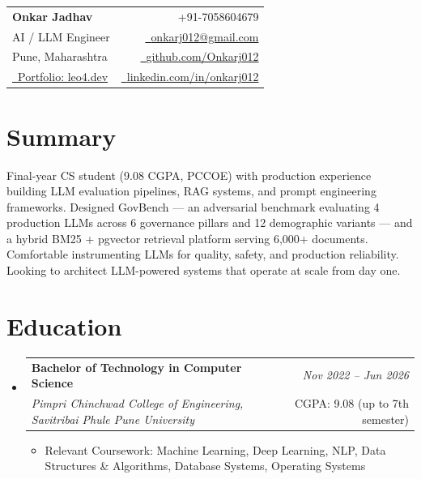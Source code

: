 \documentclass[a4paper,10.5pt]{article}
\makeatletter
\newcommand{\resumeSubheading}[4]{
\vspace{0.8mm}\item
    \begin{tabular*}{0.98\textwidth}[t]{l@{\extracolsep{\fill}}r}
        \textbf{#1} & \textit{\footnotesize{#4}} \\
        \textit{\footnotesize{#3}} & \footnotesize{#2}\\
    \end{tabular*}
    \vspace{-2.0mm}
}
\newcommand{\resumeSubHeadingListStart}{\begin{itemize}[leftmargin=0mm,label={}]}
\newcommand{\resumeItemListStart}{\begin{justify}\begin{itemize}[leftmargin=3ex, rightmargin=2ex, noitemsep, labelsep=1.2mm, itemsep=0.4mm]\small}
\newcommand{\resumeSubHeadingListEnd}{\end{itemize}\vspace{2mm}}
\newcommand{\resumeItemListEnd}{\end{itemize}\end{justify}\vspace{-2mm}}
\newcommand{\name}{Onkar Jadhav}
\newcommand{\phone}{7058604679}
\newcommand{\emaila}{onkarj012@gmail.com}
\newcommand{\github}{github.com/Onkarj012}
\newcommand{\linkedin}{linkedin.com/in/onkarj012}
\makeatother
\begin{document}
\selectfont

\begin{tabularx}{\linewidth}{L r}
  \textbf{\Large \name} & {\raisebox{0.0\height}{\footnotesize \faPhone}\ +91-\phone}\\
  {AI / LLM Engineer} &
  \href{mailto:\emaila}{\raisebox{0.0\height}{\footnotesize \faEnvelope}\ {\emaila}} \\
  {Pune, Maharashtra} &
  \href{https://\github}{\raisebox{0.0\height}{\footnotesize \faGithub}\ {\github}} \\
  {\href{https://leo4.dev}{\raisebox{0.0\height}{\footnotesize \faGlobe}\ Portfolio: leo4.dev}} &
  \href{https://\linkedin}{\raisebox{0.0\height}{\footnotesize \faLinkedin}\ {\linkedin}}
\end{tabularx}
\vspace{-4mm}

\section{\textbf{Summary}}
\vspace{1mm}
\small{
Final-year CS student (9.08 CGPA, PCCOE) with production experience building LLM evaluation pipelines, RAG systems, and prompt engineering frameworks. Designed GovBench --- an adversarial benchmark evaluating 4 production LLMs across 6 governance pillars and 12 demographic variants --- and a hybrid BM25 + pgvector retrieval platform serving 6,000+ documents. Comfortable instrumenting LLMs for quality, safety, and production reliability. Looking to architect LLM-powered systems that operate at scale from day one.
}
\vspace{-3mm}

\section{\textbf{Education}}
  \resumeSubHeadingListStart
    \resumeSubheading
      {Bachelor of Technology in Computer Science}{CGPA: 9.08 (up to 7th semester)}
      {Pimpri Chinchwad College of Engineering, Savitribai Phule Pune University}{Nov 2022 -- Jun 2026}
      \resumeItemListStart
        \item {Relevant Coursework: Machine Learning, Deep Learning, NLP, Data Structures \& Algorithms, Database Systems, Operating Systems}
      \resumeItemListEnd
\resumeSubHeadingListEnd
\vspace{-6mm}
\end{document}
